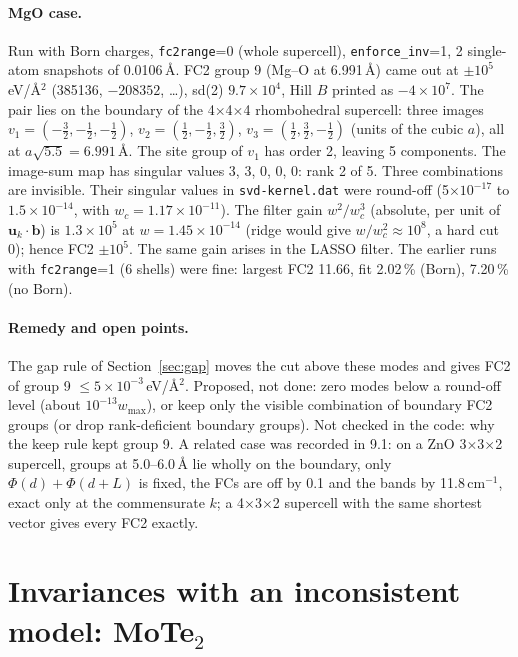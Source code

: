 \documentclass[11pt,a4paper]{article}
\newcommand{\bb}{\mathbf b}
\newcommand{\bu}{\mathbf u}
\newcommand{\code}[1]{\texttt{#1}}
\begin{document}
\paragraph{MgO case.} Run with Born charges, \code{fc2range}=0 (whole supercell), \code{enforce\_inv}=1, 2
single-atom snapshots of 0.0106\,\AA. FC2 group 9 (Mg--O at 6.991\,\AA) came out at $\pm10^5$\,eV/\AA$^2$ (385136,
$-208352$, \dots), sd(2) $9.7\times10^4$, Hill $B$ printed as $-4\times10^7$. The pair lies on the boundary of the
4$\times$4$\times$4 rhombohedral supercell: three images $v_1=(-\tfrac32,-\tfrac12,-\tfrac12)$,
$v_2=(\tfrac12,-\tfrac12,\tfrac32)$, $v_3=(\tfrac12,\tfrac32,-\tfrac12)$ (units of the cubic $a$), all at
$a\sqrt{5.5}=6.991$\,\AA. The site group of $v_1$ has order 2, leaving 5 components. The image-sum map has
singular values 3, 3, 0, 0, 0: rank 2 of 5. Three combinations are invisible. Their singular values in
\code{svd-kernel.dat} were round-off (5$\times10^{-17}$ to $1.5\times10^{-14}$, with $w_c=1.17\times10^{-11}$). The filter gain
$w^2/w_c^3$ (absolute, per unit of $\bu_k\cdot\bb$) is $1.3\times10^5$ at $w=1.45\times10^{-14}$ (ridge would give
$w/w_c^2\approx10^8$, a hard cut 0); hence FC2
$\pm10^5$. The same gain arises in the LASSO filter. The earlier runs with \code{fc2range}=1 (6 shells) were fine:
largest FC2 11.66, fit 2.02\,\% (Born), 7.20\,\% (no Born).

\paragraph{Remedy and open points.} The gap rule of Section~\ref{sec:gap} moves the cut above these modes and
gives FC2 of group 9 $\le5\times10^{-3}$\,eV/\AA$^2$. Proposed, not done: zero modes below a round-off level
(about $10^{-13}w_{\max}$), or keep only the visible combination of boundary FC2 groups (or drop
rank-deficient boundary groups). Not checked in the code: why the keep rule kept group 9. A related case was
recorded in 9.1: on a ZnO 3$\times$3$\times$2 supercell, groups at 5.0--6.0\,\AA{} lie wholly on the boundary, only
$\Phi(d)+\Phi(d+L)$ is fixed, the FCs are off by 0.1 and the bands by 11.8\,cm$^{-1}$, exact only at the
commensurate $k$; a 4$\times$3$\times$2 supercell with the same shortest vector gives every FC2 exactly.

\section{\texorpdfstring{Invariances with an inconsistent model: MoTe$_2$}{Invariances with an inconsistent model: MoTe2}}\label{sec:mote2}
\end{document}
